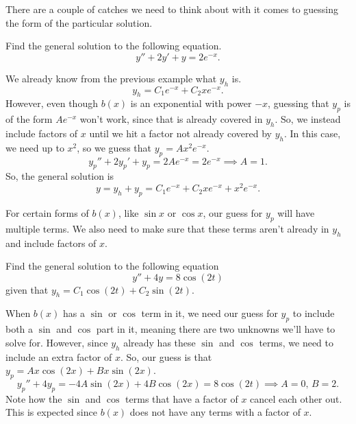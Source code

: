 \noindent
There are a couple of catches we need to think about with it comes to guessing the form of the particular solution.
\begin{example}
	Find the general solution to the following equation.
	\begin{equation*}
		y'' + 2y' + y = 2e^{-x}.
	\end{equation*}
\end{example}
\noindent
We already know from the previous example what $y_h$ is.
\begin{equation*}
	y_h = C_1e^{-x} + C_2xe^{-x}.
\end{equation*}
However, even though $b(x)$ is an exponential with power $-x$, guessing that $y_p$ is of the form $Ae^{-x}$ won't work, since that is already covered in $y_h$.
So, we instead include factors of $x$ until we hit a factor not already covered by $y_h$.
In this case, we need up to $x^2$, so we guess that $y_p = Ax^2e^{-x}$.
\begin{equation*}
	y_p'' + 2y_p'+ y_p = 2Ae^{-x} = 2e^{-x} \implies A = 1.
\end{equation*}
So, the general solution is
\begin{equation*}
	y = y_h + y_p = C_1e^{-x} + C_2xe^{-x} + x^2e^{-x}.
\end{equation*}

\noindent
For certain forms of $b(x)$, like $\sin{x}$ or $\cos{x}$, our guess for $y_p$ will have multiple terms.
We also need to make sure that these terms aren't already in $y_h$ and include factors of $x$.
\begin{example}
	Find the general solution to the following equation
	\begin{equation*}
		y'' + 4y = 8\cos{(2t)}
	\end{equation*}
	given that $y_h = C_1\cos{(2t)} + C_2\sin{(2t)}$.
\end{example}
\noindent
When $b(x)$ has a $\sin$ or $\cos$ term in it, we need our guess for $y_p$ to include both a $\sin$ and $\cos$ part in it, meaning there are two unknowns we'll have to solve for.
However, since $y_h$ already has these $\sin$ and $\cos$ terms, we need to include an extra factor of $x$.
So, our guess is that $y_p = Ax\cos{(2x)} + Bx\sin{(2x)}$.
\begin{equation*}
	y_p'' + 4y_p = -4A\sin{(2x)} + 4B\cos{(2x)} = 8\cos{(2t)} \implies A = 0 \text{, } B = 2.
\end{equation*}
Note how the $\sin$ and $\cos$ terms that have a factor of $x$ cancel each other out.
This is expected since $b(x)$ does not have any terms with a factor of $x$.\\

